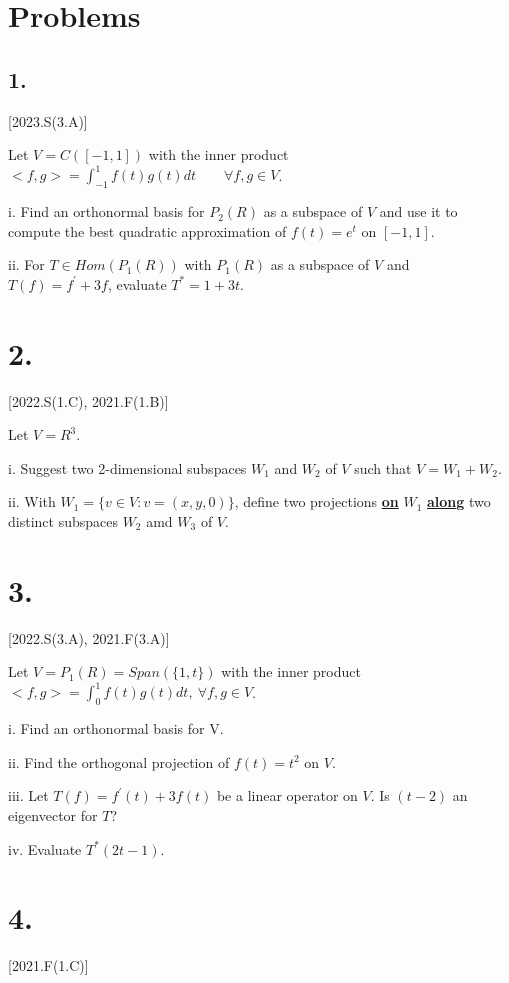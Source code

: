 \documentclass{article}
\begin{document}
\section*{Problems}

\subsection*{1.}[2023.S(3.A)]

Let $V = C([-1, 1])$ with the inner product $<f,g> = \int_{-1}^{1} f(t)g(t)dt \qquad \forall f,g \in V$.

i. Find an orthonormal basis for $P_2(R)$ as a subspace of $V$ and use it to compute the best quadratic approximation of $f(t) = e^t$ on $[-1, 1]$.

ii. For $T \in Hom(P_1(R))$ with $P_1(R)$ as a subspace of $V$ and $T(f) = f^\prime + 3f$, evaluate $T^* = 1 + 3t$.


\section*{2.}[2022.S(1.C), 2021.F(1.B)]

Let $V=R^3$.

i. Suggest two 2-dimensional subspaces $W_1$ and $W_2$ of $V$ such that $V=W_1 + W_2$.

ii. With $W_1= \{v \in V: v=(x,y,0) \}$, define two projections \textbf{\underline{on}} $W_1$ \textbf{\underline{along}} two distinct subspaces $W_2$ amd $W_3$ of $V$.


\section*{3.}[2022.S(3.A), 2021.F(3.A)]

Let $V = P_1(R) = Span(\{ 1,t \})$ with the inner product $<f,g> = \int_{0}^{1} f(t)g(t)dt, \  \forall f,g \in V$.

  i. Find an orthonormal basis for V.
  
  ii. Find the orthogonal projection of $f(t)= t^2$ on $V$.

  iii. Let $T(f) = f^\prime(t) + 3f(t)$ be a linear operator on $V$. Is $(t-2)$ an eigenvector for $T$?

  iv. Evaluate $T^*(2t-1)$.


  \section*{4.}[2021.F(1.C)]
\end{document}
